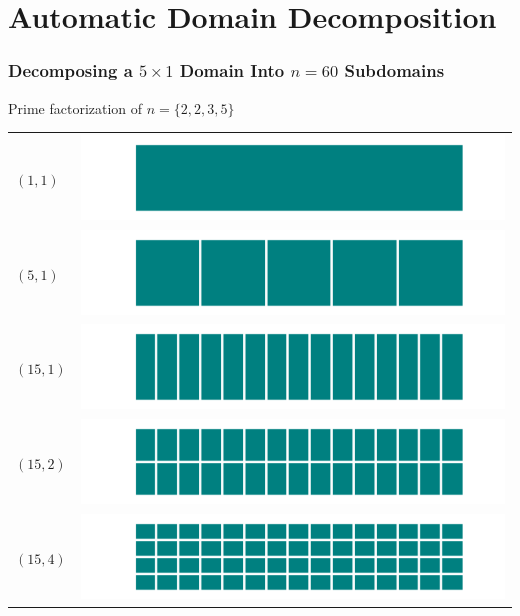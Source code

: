 \documentclass[11pt]{beamer}
\begin{document}
\section{Automatic Domain Decomposition}

\begin{frame}
  \frametitle{Decomposing a $5 \times 1$ Domain Into $n = 60$ Subdomains}
  Prime factorization of $n = \{ 2, 2, 3, 5 \}$
  \vspace{1em}
  \begin{center}
    \begin{tabular}{>{\centering\arraybackslash} m{1cm} m{4cm}}
      $(1, 1)$ & \includegraphics[width=.5\textwidth]{decomp/1x1}\\
      $(5, 1)$ & \includegraphics[width=.5\textwidth]{decomp/5x1}\\
      $(15, 1)$ & \includegraphics[width=.5\textwidth]{decomp/15x1}\\
      $(15, 2)$ & \includegraphics[width=.5\textwidth]{decomp/15x2}\\
      $(15, 4)$ & \includegraphics[width=.5\textwidth]{decomp/15x4}
    \end{tabular}
  \end{center}
\end{frame}
\end{document}

